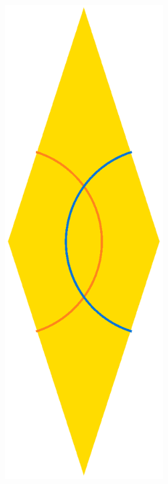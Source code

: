 \documentclass[]{article}
\begin{document}
\begin{figure}[H]
        \begin{subfigure}[b]{\textwidth}
        \begin{subfigure}[b]{0.4\textwidth}
        \centering
		\includegraphics[scale=0.4]{RhombSkinny}

\end{subfigure}
\end{subfigure}
\end{figure}
\end{document}
